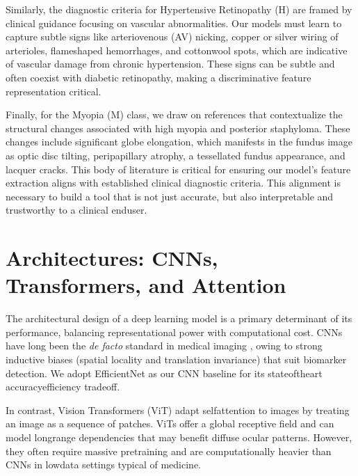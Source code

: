 Similarly, the diagnostic criteria for Hypertensive Retinopathy (H) are framed by clinical guidance \cite{docxRef14,docxRef15,docxRef16} focusing on vascular abnormalities. Our models must learn to capture subtle signs like arteriovenous (AV) nicking, copper or silver wiring of arterioles, flame\textendash shaped hemorrhages, and cotton\textendash wool spots, which are indicative of vascular damage from chronic hypertension. These signs can be subtle and often co\textendash exist with diabetic retinopathy, making a discriminative feature representation critical.

Finally, for the Myopia (M) class, we draw on references \cite{docxRef17,docxRef18} that contextualize the structural changes associated with high myopia and posterior staphyloma. These changes include significant globe elongation, which manifests in the fundus image as optic disc tilting, peripapillary atrophy, a tessellated fundus appearance, and lacquer cracks. This body of literature \cite{docxRef07,docxRef09,docxRef12,docxRef14,docxRef15,docxRef16,docxRef17,docxRef18} is critical for ensuring our model's feature extraction aligns with established clinical diagnostic criteria. This alignment is necessary to build a tool that is not just accurate, but also interpretable and trustworthy to a clinical end\textendash user.

\section{Architectures: CNNs, Transformers, and Attention}
The architectural design of a deep learning model is a primary determinant of its performance, balancing representational power with computational cost. CNNs have long been the \textit{de facto} standard in medical imaging \cite{docxRef19,docxRef20,docxRef21}, owing to strong inductive biases (spatial locality and translation invariance) that suit biomarker detection. We adopt EfficientNet \cite{tan2019efficientnet} as our CNN baseline for its state\textendash of\textendash the\textendash art accuracy\textendash efficiency trade\textendash off.

In contrast, Vision Transformers (ViT) \cite{dosovitskiy2021vit,docxRef23,docxRef24,docxRef25,docxRef26} adapt self\textendash attention to images by treating an image as a sequence of patches. ViTs offer a global receptive field and can model long\textendash range dependencies that may benefit diffuse ocular patterns. However, they often require massive pretraining and are computationally heavier than CNNs in low\textendash data settings typical of medicine.

